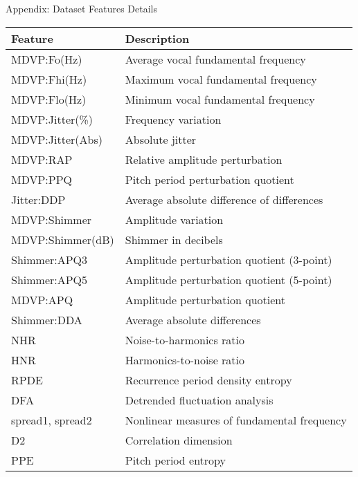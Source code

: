 \documentclass[aspectratio=169]{beamer}
\begin{document}
\begin{frame}{Appendix: Dataset Features Details}
\begin{table}
\centering
\tiny
\begin{tabular}{lp{9cm}}
\toprule
\textbf{Feature} & \textbf{Description} \\
\midrule
MDVP:Fo(Hz) & Average vocal fundamental frequency \\
MDVP:Fhi(Hz) & Maximum vocal fundamental frequency \\
MDVP:Flo(Hz) & Minimum vocal fundamental frequency \\
MDVP:Jitter(\%) & Frequency variation \\
MDVP:Jitter(Abs) & Absolute jitter \\
MDVP:RAP & Relative amplitude perturbation \\
MDVP:PPQ & Pitch period perturbation quotient \\
Jitter:DDP & Average absolute difference of differences \\
MDVP:Shimmer & Amplitude variation \\
MDVP:Shimmer(dB) & Shimmer in decibels \\
Shimmer:APQ3 & Amplitude perturbation quotient (3-point) \\
Shimmer:APQ5 & Amplitude perturbation quotient (5-point) \\
MDVP:APQ & Amplitude perturbation quotient \\
Shimmer:DDA & Average absolute differences \\
NHR & Noise-to-harmonics ratio \\
HNR & Harmonics-to-noise ratio \\
RPDE & Recurrence period density entropy \\
DFA & Detrended fluctuation analysis \\
spread1, spread2 & Nonlinear measures of fundamental frequency \\
D2 & Correlation dimension \\
PPE & Pitch period entropy \\
\bottomrule
\end{tabular}
\end{table}
\end{frame}
\end{document}
